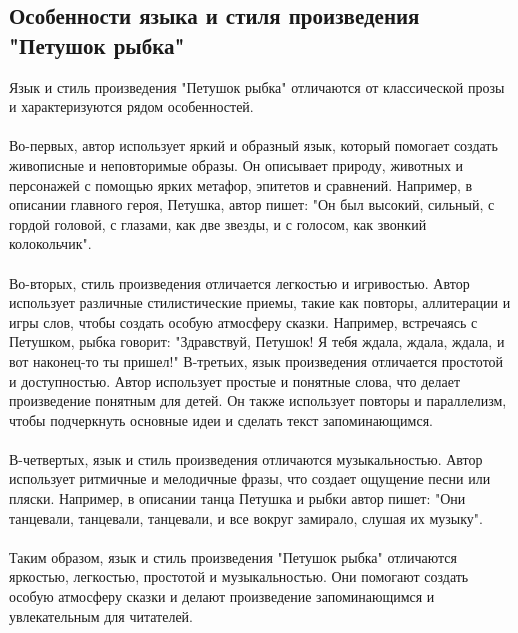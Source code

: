 \documentclass{article}
\begin{document}
\subsection{Особенности языка и стиля произведения "{}{}Петушок рыбка"{}{}}
Язык и стиль произведения "{}{}Петушок рыбка"{}{} отличаются от классической прозы и характеризуются рядом особенностей.\\
~\\
Во-первых, автор использует яркий и образный язык, который помогает создать живописные и неповторимые образы. Он описывает природу, животных и персонажей с помощью ярких метафор, эпитетов и сравнений. Например, в описании главного героя, Петушка, автор пишет: "{}{}Он был высокий, сильный, с гордой головой, с глазами, как две звезды, и с голосом, как звонкий колокольчик"{}{}.\\
~\\
Во-вторых, стиль произведения отличается легкостью и игривостью. Автор использует различные стилистические приемы, такие как повторы, аллитерации и игры слов, чтобы создать особую атмосферу сказки. Например, встречаясь с Петушком, рыбка говорит: "{}{}Здравствуй, Петушок! Я тебя ждала, ждала, ждала, и вот наконец-то ты пришел!"{}{}
В-третьих, язык произведения отличается простотой и доступностью. Автор использует простые и понятные слова, что делает произведение понятным для детей. Он также использует повторы и параллелизм, чтобы подчеркнуть основные идеи и сделать текст запоминающимся.\\
~\\
В-четвертых, язык и стиль произведения отличаются музыкальностью. Автор использует ритмичные и мелодичные фразы, что создает ощущение песни или пляски. Например, в описании танца Петушка и рыбки автор пишет: "{}{}Они танцевали, танцевали, танцевали, и все вокруг замирало, слушая их музыку"{}{}.\\
~\\
Таким образом, язык и стиль произведения "{}{}Петушок рыбка"{}{} отличаются яркостью, легкостью, простотой и музыкальностью. Они помогают создать особую атмосферу сказки и делают произведение запоминающимся и увлекательным для читателей.
\end{document}
